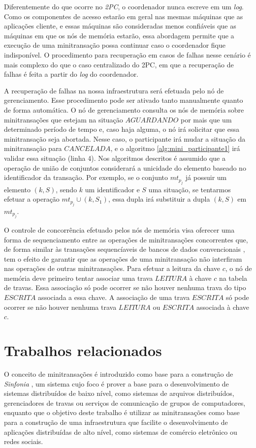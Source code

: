 \documentclass[11pt,twoside,a4paper]{book}
\begin{document}
Diferentemente do que ocorre no \emph{2PC}, o coordenador nunca escreve em um \emph{log}. Como os componentes de acesso estarão em geral nas mesmas máquinas que as aplicações cliente, e essas máquinas são consideradas menos confiáveis que as máquinas em que os nós de memória estarão, essa abordagem permite que a execução de uma minitransação possa continuar caso o coordenador fique indisponível. O procedimento para recuperação em casos de falhas nesse cenário é mais complexo do que o caso centralizado do 2PC, em que a recuperação de falhas é feita a partir do \emph{log} do coordenador.

A recuperação de falhas na nossa infraestrutura será efetuada pelo nó de gerenciamento. Esse procedimento pode ser ativado tanto manualmente quanto de forma automática. O nó de gerenciamento consulta os nós de memória sobre minitransações que estejam na situação $AGUARDANDO$ por mais que um determinado período de tempo e, caso haja alguma, o nó irá solicitar que essa minitransação seja abortada. Nesse caso, o participante irá mudar a situação da minitransação para $CANCELADA$, e o algoritmo \ref{alg:mini_participante1} irá validar essa situação (linha 4). Nos algoritmos descritos é assumido que a operação de união de conjuntos considerará a unicidade do elemento baseado no identificador da transação. Por exemplo, se o conjunto $mt_{p_j}$ já possuir um elemento $(k, S)$, sendo $k$ um identificador e $S$ uma situação, se tentarmos efetuar a operação $mt_{p_j} \cup (k, S_1)$, essa dupla irá substituir a dupla $(k,S)$ em $mt_{p_j}$.

O controle de concorrência efetuado pelos nós de memória visa oferecer uma forma de sequenciamento entre as operações de minitransações concorrentes que, de forma similar às transações sequencíaveis de bancos de dados convencionais \cite{vaca}, tem o efeito de garantir que as operações de uma minitransação não interfiram nas operações de outras minitransações. Para efetuar a leitura da chave $c$, o nó de memória deve primeiro tentar associar uma trava $LEITURA$ à chave $c$ na tabela de travas. Essa associação só pode ocorrer se não houver nenhuma trava do tipo $ESCRITA$ associada a essa chave. A associação de uma trava $ESCRITA$ só pode ocorrer se não houver nenhuma trava $LEITURA$ ou $ESCRITA$ associada à chave $c$.

\section{Trabalhos relacionados}
\label{sec:trabalhos_relacionados}
O conceito de minitransações é introduzido como base para a construção de \emph{Sinfonia} \cite{sinfonia}, um sistema cujo foco é prover a base para o desenvolvimento de sistemas distribuídos de baixo nível, como sistemas de arquivos distribuídos, gerenciadores de travas ou serviços de comunicação de grupos de computadores, enquanto que o objetivo deste trabalho é utilizar as minitransações como base para a construção de uma infraestrutura que facilite o desenvolvimento de aplicações distribuídas de alto nível, como sistemas de comércio eletrônico ou redes sociais. 
\end{document}
